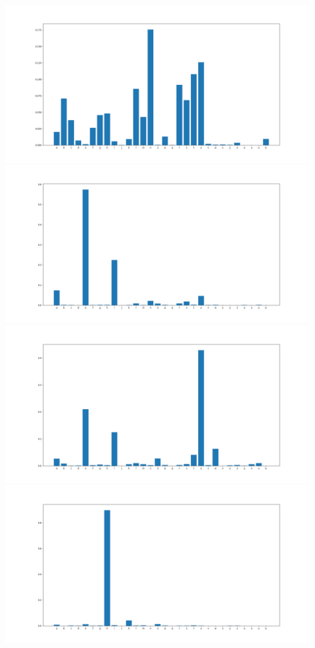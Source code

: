\documentclass{article}
\begin{document}
\begin{itemize}
\includegraphics[width=\textwidth]{./plots/ahistory}
\includegraphics[width=\textwidth]{./plots/dhistory}
\includegraphics[width=\textwidth]{./plots/zhistory}
\includegraphics[width=\textwidth]{./plots/chistory}

\end{itemize}
\end{document}
